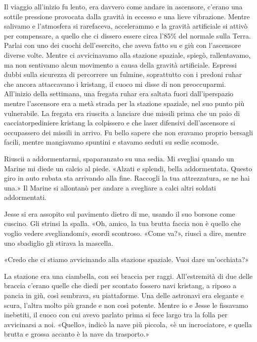 Il viaggio all'inizio fu lento, era davvero come andare in ascensore,
c'erano una sottile pressione provocata dalla gravità in eccesso e una
lieve vibrazione. Mentre salivamo e l'atmosfera si rarefaceva,
accelerammo e la gravità artificiale si attivò per compensare, a quello
che ci dissero essere circa l'85\% del normale sulla Terra. Parlai con
uno dei cuochi dell'esercito, che aveva fatto su e giù con l'ascensore
diverse volte. Mentre ci avvicinavamo alla stazione spaziale, spiegò,
rallentavamo, ma non sentivamo alcun movimento a causa della gravità
artificiale. Espressi dubbi sulla sicurezza di percorrere un fulmine,
soprattutto con i predoni ruhar che ancora attaccavano i kristang, il
cuoco mi disse di non preoccuparmi. All'inizio della settimana, una
fregata ruhar era saltata fuori dall'iperspazio mentre l'ascensore era a
metà strada per la stazione spaziale, nel suo punto più vulnerabile. La
fregata era riuscita a lanciare due missili prima che un paio di
cacciatorpediniere kristang la colpissero e che laser difensivi
dell'ascensore si occupassero dei missili in arrivo. Fu bello sapere che
non eravamo proprio bersagli facili, mentre mangiavamo spuntini e
stavamo seduti su sedie scomode.

Riuscii a addormentarmi, spaparanzato su una sedia. Mi svegliai quando
un Marine mi diede un calcio al piede. «Alzati e splendi, bella
addormentata. Questo giro in auto rubata sta arrivando alla fine.
Raccogli la tua attrezzatura, se ne hai una.» Il Marine si allontanò per
andare a svegliare a calci altri soldati addormentati.

Jesse si era assopito sul pavimento dietro di me, usando il suo borsone
come cuscino. Gli strinsi la spalla. «Oh, amico, la tua brutta faccia
non è quello che voglio vedere svegliandomi», esordì scontroso. «Come
va?», riuscì a dire, mentre uno sbadiglio gli stirava la mascella.

«Credo che ci stiamo avvicinando alla stazione spaziale. Vuoi dare
un'occhiata?»

\hfill\break

La stazione era una ciambella, con sei braccia per raggi. All'estremità
di due delle braccia c'erano quelle che diedi per scontato fossero navi
kristang, a riposo a pancia in giù, così sembrava, su piattaforme. Una
delle astronavi era elegante e scura, l'altra molto più grande e non
così potente. Mentre io e Jesse le fissavamo inebetiti, il cuoco con cui
avevo parlato prima si fece largo tra la folla per avvicinarsi a noi.
«Quello», indicò la nave più piccola, «è un incrociatore, e quella
brutta e grossa accanto è la nave da trasporto.»

